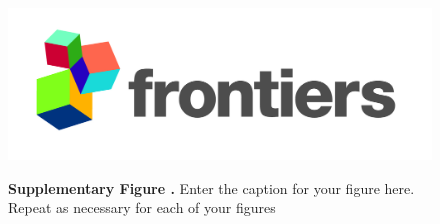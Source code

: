\documentclass{frontiers_suppmat} %
\begin{document}
\begin{figure}
\begin{center}
\includegraphics[width=15cm]{logo1}%
\end{center}
\textbf{\label{fig:01} Supplementary Figure .}{ Enter the caption for your figure here.  Repeat as  necessary for each of your figures }
\end{figure}



%
\end{document}
